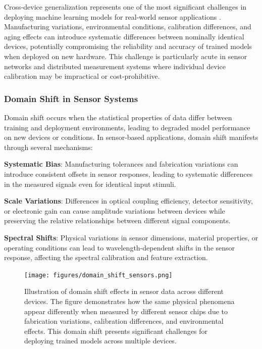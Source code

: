 Cross-device generalization represents one of the most significant challenges in deploying machine learning models for real-world sensor applications \cite{transfer_learning_ref}. Manufacturing
variations, environmental conditions, calibration differences, and aging effects can introduce systematic differences between nominally identical devices, potentially compromising the reliability
and accuracy of trained models when deployed on new hardware. This challenge is particularly acute in sensor networks and distributed measurement systems where individual device calibration may be
impractical or cost-prohibitive.

\subsubsection{Domain Shift in Sensor Systems}

Domain shift occurs when the statistical properties of data differ between training and deployment environments, leading to degraded model performance on new devices or conditions. In sensor-based
applications, domain shift manifests through several mechanisms:

\textbf{Systematic Bias}: Manufacturing tolerances and fabrication variations can introduce consistent offsets in sensor responses, leading to systematic differences in the measured signals even
for identical input stimuli.

\textbf{Scale Variations}: Differences in optical coupling efficiency, detector sensitivity, or electronic gain can cause amplitude variations between devices while preserving the relative
relationships between different signal components.

\textbf{Spectral Shifts}: Physical variations in sensor dimensions, material properties, or operating conditions can lead to wavelength-dependent shifts in the sensor response, affecting the
spectral calibration and feature extraction.

\begin{figure}[htbp]
  \centering
  \texttt{[image: figures/domain\_shift\_sensors.png]}
  \caption{Illustration of domain shift effects in sensor data across different devices. The figure demonstrates how the same physical phenomena appear differently when measured by different
sensor chips due to fabrication variations, calibration differences, and environmental effects. This domain shift presents significant challenges for deploying trained models across multiple
devices.}
  \label{fig:domain_shift}
\end{figure}

